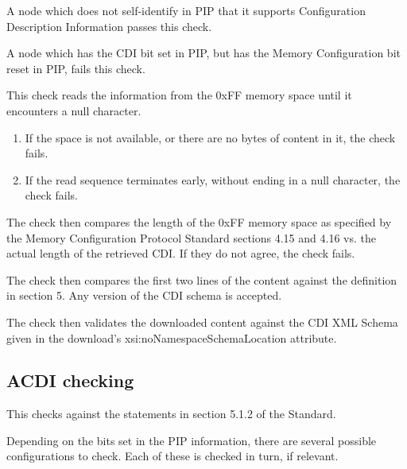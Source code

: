 A node which does not self-identify in PIP that it supports
Configuration Description Information passes this check.

A node which has the CDI bit set in PIP, but
has the Memory Configuration bit reset in PIP, fails this check.
\pipsetFootnote

This check reads the information from the 0xFF memory space
until it encounters a null character.
\begin{enumerate}
\item If the space is not available, or there are no bytes of content in it, the check fails.
\item If the read sequence terminates early, without ending in a null character, the check fails.
\end{enumerate}
 
The check then compares the length of the 0xFF memory space 
as specified by the Memory Configuration Protocol Standard sections 4.15 and 4.16
vs. the actual length of the retrieved CDI.
If they do not agree, the check fails.

The check then compares the first two lines of the content against the 
definition in section 5. 
Any version of the CDI schema is accepted.

The check then validates the downloaded content against the CDI XML Schema
given in the download's xsi:noNamespaceSchemaLocation attribute.

\subsection{ACDI checking}

This checks against the statements in section 5.1.2 of the Standard.

Depending on the bits set in the PIP information, there are several 
possible configurations to check. Each of these is checked in turn, if relevant.

